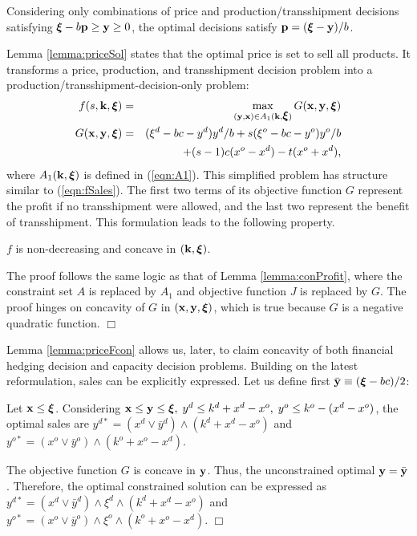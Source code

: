 \documentclass[mnsc,nonblindrev,copyedit]{informs2_wz} %
\newcommand{\proof}{\noindent{\bf Proof: } }
\newcommand{\qed}{ \hfill $\Box$ }
\newcommand{\OUT}[1]{}
\newcommand{\xiv}{\mbox{\boldmath$\xi$}}
\begin{document}
{\lemma Considering only combinations of price and production/transshipment decisions satisfying $\xiv-b\bold p\geq \bold y \geq 0$, the optimal decisions satisfy $\bold p = (\xiv-\bold y)/b$. \label{lemma:priceSol}}



Lemma \ref{lemma:priceSol} states that the optimal price is set to sell all products.  It transforms a {price, production, and transshipment decision} problem into a production/transshipment-decision-only problem:
\begin{eqnarray}
f(s,\bold {k},\xiv) &=& \max_{(\bold{y,x}) \in A_1(\bold{k},\xiv)}
G(\bold{x,y},\xiv) \label{eqn:fPSales}\\
G(\bold{x,y},\xiv) &=& (\xi^d-bc-y^d)y^d/b + s(\xi^o-bc-y^o)y^o/b
\nonumber \\&& + (s-1)c(x^o -x^d) -t(x^o + x^d)
\label{eqn:GPrice},
\end{eqnarray}
where $A_1(\bold{k},\xiv)$ is defined in (\ref{eqn:A1}).  This simplified problem has structure similar to (\ref{eqn:fSales}).  The first two terms of its objective function $G$ represent the profit if no transshipment were allowed, and the last two represent the benefit of transshipment.  This formulation leads to the following property.


{\lemma $f$ is non-decreasing and concave in $(\bold k, \xiv)$. \label{lemma:priceFcon}}


\proof The proof follows the same logic as that of Lemma \ref{lemma:conProfit}, where the constraint set $A$ is replaced by $A_1$ and objective function $J$ is replaced by $G$.  The proof hinges on concavity of $G$ in $(\bold x, \bold y, \xiv)$, which is true because $G$ is a negative quadratic function. \qed \OUT{}

Lemma \ref{lemma:priceFcon} allows us, later, to claim concavity of both { financial hedging decision} and { capacity decision} problems.  Building on the latest reformulation, sales can be explicitly expressed.  Let us define first $\bar{\bold y} \equiv (\xiv-bc)/2$:


{\lemma Let $\bold x \leq \xiv$.  Considering $\bold x \leq \bold y \leq \xiv, \; y^d \leq k^d+x^d - x^o, \; y^o \leq k^o -(x^d - x^o)$, the optimal sales are $y^{d*} = (x^d\vee \bar{y}^d)\wedge (k^d +x^d-x^o)$ and $y^{o*} = (x^o\vee \bar{y}^o)\wedge( k^o+x^o-x^d)$. \label{lemma:solPSales}}

\proof The objective function $G$ is concave in $\bold y$.  Thus, the unconstrained optimal $\bold y = \bar{\bold y}$.  Therefore, the optimal constrained solution can be expressed as $y^{d*} = (x^d\vee \bar{y}^d)\wedge \xi^d \wedge (k^d+x^d-x^o)$ and $y^{o*} = (x^o\vee \bar{y}^o)\wedge \xi^o \wedge (k^o+x^o-x^d)$. \qed
\end{document}
